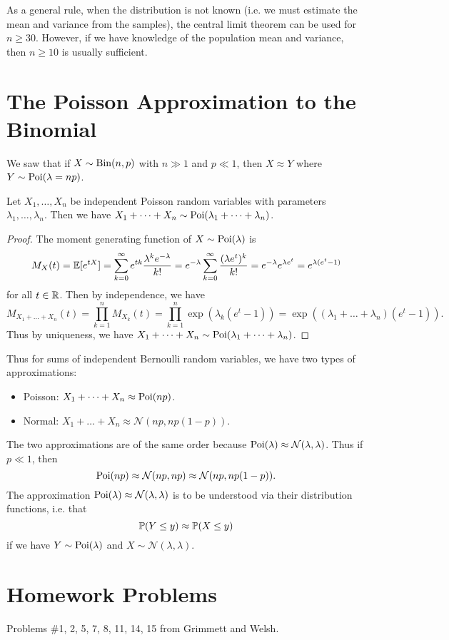 \begin{remark}
  As a general rule, when the distribution is
  not known (i.e. we must estimate the mean and
  variance from the samples), the central limit
  theorem can be used for $n \ge 30$. However, if
  we have knowledge of the population
  mean and variance, then $n \ge 10$ is usually
  sufficient.
\end{remark}

\section{The Poisson Approximation to the Binomial}
\begin{remark}
  We saw that if $X \sim \operatorname{Bin}(n, p)$
  with $n \gg 1$ and $p \ll 1$, then
  $X \approx Y$ where $Y \sim \operatorname{Poi}(\lambda = np)$.
\end{remark}

\begin{prop}
  Let $X_1, \dots, X_n$ be independent Poisson
  random variables with parameters
  $\lambda_1, \dots, \lambda_n$. Then we have
  $X_1 + \dots + X_n \sim \operatorname{Poi}(\lambda_1 + \dots + \lambda_n)$.
\end{prop}

\begin{proof}
  The moment generating function of
  $X \sim \operatorname{Poi}(\lambda)$ is
  \[
    M_X(t) = \mathbb{E}[e^{tX}]
    = \sum_{k = 0}^\infty e^{tk} \frac{\lambda^k e^{-\lambda}}{k!}
    = e^{-\lambda }\sum_{k = 0}^\infty \frac{(\lambda e^t)^k}{k!}
    = e^{-\lambda} e^{\lambda e^t}
    = e^{\lambda(e^t - 1)}
  \]
  for all $t \in \mathbb{R}$. Then by independence,
  we have
  \[
    M_{X_1 + \dots + X_n}(t)
    = \prod_{k = 1}^n M_{X_k}(t)
    = \prod_{k = 1}^n \exp(\lambda_k(e^t - 1))
    = \exp((\lambda_1 + \dots + \lambda_n)(e^t - 1)).
  \]
  Thus by uniqueness, we have
  $X_1 + \dots + X_n \sim \operatorname{Poi}(\lambda_1 + \dots + \lambda_n)$.
\end{proof}

\begin{remark}
  Thus for sums of independent Bernoulli random
  variables, we have two types of approximations:
  \begin{itemize}
    \item Poisson: $X_1 + \dots + X_n \approx \operatorname{Poi}(np)$.
    \item Normal: $X_1 + \dots + X_n \approx \mathcal{N}(np, np(1 - p))$.
  \end{itemize}
  The two approximations are of the same order
  because $\operatorname{Poi}(\lambda) \approx \mathcal{N}(\lambda, \lambda)$.
  Thus if $p \ll 1$, then
  \[
    \operatorname{Poi}(np) \approx \mathcal{N}(np, np)
    \approx \mathcal{N}(np, np(1 - p)).
  \]
  The approximation $\operatorname{Poi}(\lambda) \approx \mathcal{N}(\lambda, \lambda)$
  is to be understood via their distribution
  functions, i.e. that
  \[
    \mathbb{P}(Y \le y)
    \approx \mathbb{P}(X \le y)
  \]
  if we have $Y \sim \operatorname{Poi}(\lambda)$ and
  $X \sim \mathcal{N}(\lambda, \lambda)$.
\end{remark}

\section{Homework Problems}
Problems \#1, 2, 5, 7, 8, 11, 14, 15
from Grimmett and Welsh.
